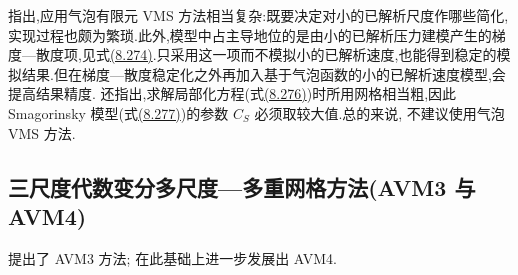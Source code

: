 \begin{note}
\label{note:vms-bubble-numerical-experience}
\textcite{JohnKindl2010a} 指出,应用气泡有限元 VMS 方法相当复杂:既要决定对小的已解析尺度作哪些简化,实现过程也颇为繁琐.此外,模型中占主导地位的是由小的已解析压力建模产生的梯度—散度项,见式\hyperref[eq:vms-bubble-divergence-terms]{(8.274)}.只采用这一项而不模拟小的已解析速度,也能得到稳定的模拟结果.但在梯度—散度稳定化之外再加入基于气泡函数的小的已解析速度模型,会提高结果精度.\textcite{JohnKindl2010a} 还指出,求解局部化方程(式\hyperref[eq:vms-bubble-small-scale-method]{(8.276)})时所用网格相当粗,因此 Smagorinsky 模型(式\hyperref[eq:vms-bubble-smagorinsky-models]{(8.277)})的参数 $C_S$ 必须取较大值.总的来说,\textcite{JohnKindl2010a} 不建议使用气泡 VMS 方法.
\end{note}

\subsection{三尺度代数变分多尺度—多重网格方法(AVM3 与 AVM4)}
\label{subsec:vms-orthogonal-subscales}

\begin{note}[历史]
\label{note:vms-avm-history}
\textcite{GravemeierGeeWall2009,GravemeierGeeKronbichlerWall2010} 提出了 AVM3 方法;\textcite{RasthoferGravemeier2013} 在此基础上进一步发展出 AVM4.
\end{note}

